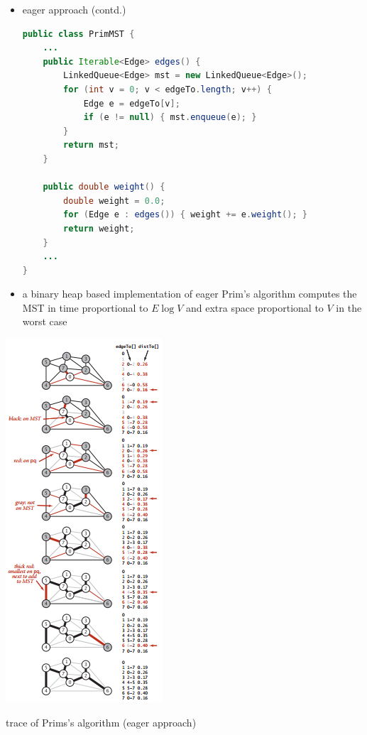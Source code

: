 \documentclass[8pt,a4paper,compress]{beamer}
\begin{document}
\begin{frame}[fragile]
\begin{minipage}{240pt}
\begin{itemize}
\item eager approach (contd.)

\begin{lstlisting}[language=Java]
public class PrimMST {
    ...
    public Iterable<Edge> edges() {
        LinkedQueue<Edge> mst = new LinkedQueue<Edge>();
        for (int v = 0; v < edgeTo.length; v++) {
            Edge e = edgeTo[v];
            if (e != null) { mst.enqueue(e); }
        }
        return mst;
    }

    public double weight() {
        double weight = 0.0;
        for (Edge e : edges()) { weight += e.weight(); }
        return weight;
    }
    ...
}
\end{lstlisting}

\item a binary heap based implementation of eager Prim's algorithm computes the MST in time proportional to $E \log V$ and extra space proportional to $V$ in the worst case
\end{itemize}
\end{minipage}%
\begin{minipage}{90pt}
\begin{center}
\includegraphics[scale=0.4]{./figures/mst6.png}

\smallskip

\tiny trace of Prims's algorithm (eager approach)
\end{center}
\end{minipage}
\end{frame}
\end{document}
